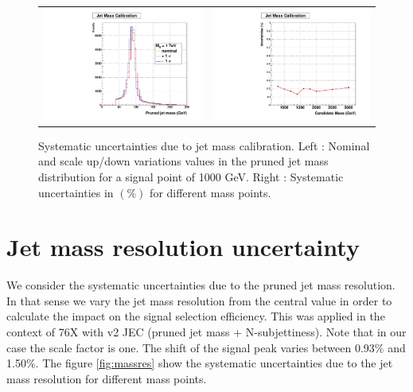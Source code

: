 \begin{figure}[!ht]
\caption{ Systematic uncertainties due to jet mass calibration. Left : Nominal and scale up/down variations values in the pruned jet mass distribution for a signal point of 1000 GeV. Right  : Systematic uncertainties in $(\%)$ for different mass points.}
\begin{tabular}{cc}
 \includegraphics[width=220pt]{figures/SystUncert/JetmassScale1000.pdf} &
\includegraphics[width=220pt]{figures/SystUncert/JetMassCalib.pdf}\\
\end{tabular}
\label{fig:masscalib}
\end{figure}

\section{Jet mass resolution  uncertainty}

We consider the systematic uncertainties due to the pruned jet mass resolution. In that sense we vary the jet mass resolution from the central value  in order to calculate the impact on the signal selection efficiency. This was applied in the context of 76X with v2 JEC (pruned jet mass + N-subjettiness). Note that in our case the scale factor is one. The shift of the signal peak varies between 0.93$\%$ and 1.50$\%$. The figure \ref{fig:massres} show the systematic uncertainties due to the jet mass resolution for different mass points. 

